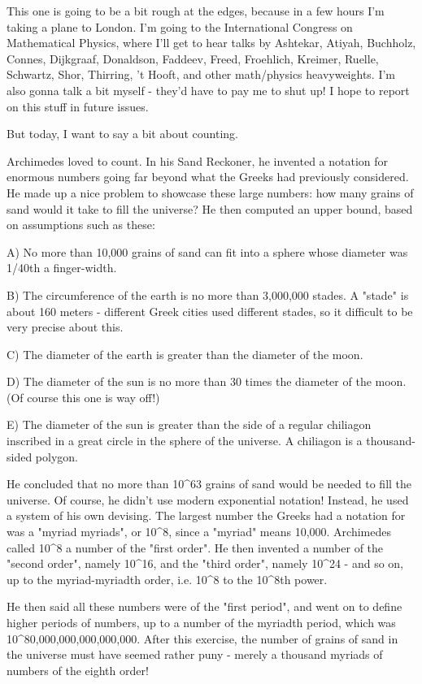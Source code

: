 

This one is going to be a bit rough at the edges, because in a
few hours I'm taking a plane to London.  I'm going to the International
Congress on Mathematical Physics, where I'll get to hear talks by 
Ashtekar, Atiyah, Buchholz, Connes, Dijkgraaf, Donaldson, Faddeev, 
Freed, Froehlich, Kreimer, Ruelle, Schwartz, Shor, Thirring, 't Hooft, 
and other math/physics heavyweights.  I'm also gonna talk a bit myself -
they'd have to pay me to shut up!  I hope to report on this stuff in 
future issues.  

But today, I want to say a bit about counting.

Archimedes loved to count.  In his Sand Reckoner, he invented a notation 
for enormous numbers going far beyond what the Greeks had previously 
considered.  He made up a nice problem to showcase these large numbers:
how many grains of sand would it take to fill the universe?   He then
computed an upper bound, based on assumptions such as these:

A) No more than 10,000 grains of sand can fit into a sphere whose 
diameter was 1/40th a finger-width.

B) The circumference of the earth is no more than 3,000,000 stades.
A "stade" is about 160 meters - different Greek cities used different
stades, so it difficult to be very precise about this.

C) The diameter of the earth is greater than the diameter of the moon.

D) The diameter of the sun is no more than 30 times the diameter of the 
moon.  (Of course this one is way off!)

E) The diameter of the sun is greater than the side of a regular chiliagon 
inscribed in a great circle in the sphere of the universe.  A chiliagon 
is a thousand-sided polygon.


 He concluded that no more than 10^{63} grains of sand would
be needed to fill the universe.  Of course, he didn't use modern
exponential notation!  Instead, he used a system of his own devising.
The largest number the Greeks had a notation for was a "myriad
myriads", or 10^{8}, since a "myriad" means
10,000.  Archimedes called 10^{8} a number of the "first
order".  He then invented a number of the "second order",
namely 10^{16}, and the "third
order", namely 10^{24} - and so on, up to the
myriad-myriadth order, i.e. 10^{8} to the 10^{8}th
power.

He then said all these numbers were of the "first period", and went on to
define higher periods of numbers, up to a number of the myriadth period, 
which was 10^{80,000,000,000,000,000}.   After this exercise, the number
of grains of sand in the universe must have seemed rather puny - merely 
a thousand myriads of numbers of the eighth order!

